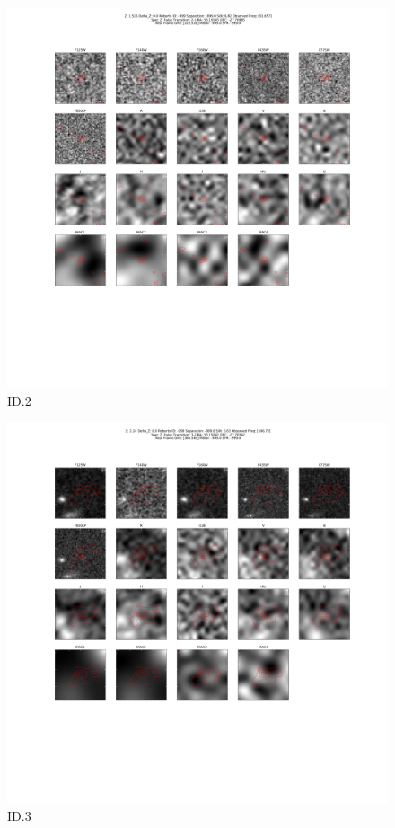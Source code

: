 \begin{figure}[tbp]
\centering \includegraphics[width=120mm]{Matched/ASPECS_Cutout_1.png}
\caption{ID.2}
\label{fig:Match_Two}
\end{figure}

\begin{figure}[tbp]
\centering \includegraphics[width=120mm]{Matched/ASPECS_Cutout_3.png}
\caption{ID.3}
\label{fig:Match_Three}
\end{figure}

